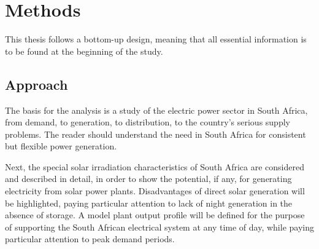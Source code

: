 \chapter{Methods}


This thesis follows a bottom-up design, meaning that all essential information is to be found at the beginning of the study.

\section{Approach}

The basis for the analysis is a study of the electric power sector in South Africa, from demand, to generation, to distribution, to the country's serious supply problems. The reader should understand the need in South Africa for consistent but flexible power generation.


Next, the special solar irradiation characteristics of South Africa are considered and described in detail, in order to show the potential, if any, for generating electricity from solar power plants. Disadvantages of direct solar generation will be highlighted, paying particular attention to lack of night generation in the absence of storage. A model plant output profile will be defined for the purpose of supporting the South African electrical system at any time of day, while paying particular attention to peak demand periods.

